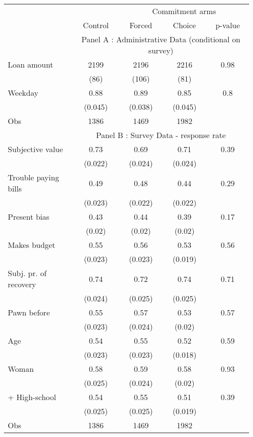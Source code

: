 \begin{tabular}{lcccc}
\toprule
      &       & \multicolumn{3}{c}{Commitment arms} \\
\cmidrule{3-5}      & \multicolumn{1}{p{4.5em}}{Control} & \multicolumn{1}{p{4.93em}}{Forced} & \multicolumn{1}{p{3.43em}}{Choice} & \multicolumn{1}{p{3.43em}}{p-value} \\
\midrule
      & \multicolumn{4}{c}{Panel A : Administrative Data (conditional on survey)} \\
\midrule
\midrule
Loan amount  & 2199  & 2196  & 2216  & 0.98 \\
      & (86)  & (106) & (81)  &  \\
Weekday & 0.88  & 0.89  & 0.85  & 0.8 \\
      & (0.045) & (0.038) & (0.045) &  \\
\midrule
Obs   & 1386  & 1469  & 1982  &  \\
\midrule
      & \multicolumn{4}{c}{Panel B : Survey Data - response rate} \\
\midrule
\midrule
Subjective value & 0.73  & 0.69  & 0.71  & 0.39 \\
      & (0.022) & (0.024) & (0.024) &  \\
Trouble paying bills & 0.49  & 0.48  & 0.44  & 0.29 \\
      & (0.023) & (0.022) & (0.022) &  \\
Present bias & 0.43  & 0.44  & 0.39  & 0.17 \\
      & (0.02) & (0.02) & (0.02) &  \\
Makes budget & 0.55  & 0.56  & 0.53  & 0.56 \\
      & (0.023) & (0.023) & (0.019) &  \\
Subj. pr. of recovery & 0.74  & 0.72  & 0.74  & 0.71 \\
      & (0.024) & (0.025) & (0.025) &  \\
Pawn before & 0.55  & 0.57  & 0.53  & 0.57 \\
      & (0.023) & (0.024) & (0.02) &  \\
Age   & 0.54  & 0.55  & 0.52  & 0.59 \\
      & (0.023) & (0.023) & (0.018) &  \\
Woman & 0.58  & 0.59  & 0.58  & 0.93 \\
      & (0.025) & (0.024) & (0.02) &  \\
+ High-school & 0.54  & 0.55  & 0.51  & 0.39 \\
      & (0.025) & (0.025) & (0.019) &  \\
\midrule
Obs   & 1386  & 1469  & 1982  &  \\
\bottomrule
\bottomrule
\end{tabular}%

